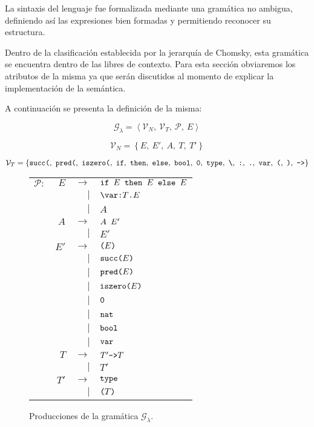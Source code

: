 \documentclass[11pt]{article}
\newcommand\produces{$\rightarrow$ \qquad}
\newcommand\alsoproduces{$\vert$}
\begin{document}
La sintaxis del lenguaje fue formalizada mediante una gramática no ambigua,
definiendo así las expresiones bien formadas y permitiendo reconocer su
estructura.

Dentro de la clasificación establecida por la jerarquía de Chomsky, esta
gramática se encuentra dentro de las libres de contexto. Para esta sección
obviaremos los atributos de la misma ya que serán discutidos al momento de
explicar la implementación de la semántica.

A continuación se presenta la definición de la misma:

\[ \mathcal{G}_{\lambda} = \left\langle
	\mathcal{V}_N,\ \mathcal{V}_T,\ \mathcal{P},\ E \right\rangle \]

\[ \mathcal{V}_N = \left\lbrace E,\ E',\ A,\ T,\ T' \right\rbrace \]

\[ \mathcal{V}_T = \left\lbrace
	\verb|succ(|,\ \verb|pred(|,\ \verb|iszero(|,\ 
	\verb|if|,\ \verb|then|,\ \verb|else|,\ \verb|bool|,\ 
    \verb|0|,\ \verb|type|,\ \verb|\|,\ \verb|:|,\ \verb|.|,\ 
    \verb|var|,\ \verb|(|,\ \verb|)|,\ \verb|->|
    \right\rbrace \]

\begin{figure}[H] \centering
\begin{tabular}{lrrl}
$\mathcal{P}:$
& $E$  & \produces     & $\verb|if | E \verb| then | E \verb| else | E$ \\
&      & \alsoproduces & $\verb|\var:| T \verb|.| E$ \\
&      & \alsoproduces & $A$ \\
& $A$  & \produces     & $A \verb| | E'$ \\
&      & \alsoproduces & $E'$ \\
& $E'$ & \produces     & $\verb|(| E \verb|)|$ \\
&      & \alsoproduces & $\verb|succ(| E \verb|)|$ \\
&      & \alsoproduces & $\verb|pred(| E \verb|)|$ \\
&      & \alsoproduces & $\verb|iszero(| E \verb|)|$ \\
&      & \alsoproduces & $\verb|0|$ \\
&      & \alsoproduces & $\verb|nat|$ \\
&      & \alsoproduces & $\verb|bool|$ \\
&      & \alsoproduces & $\verb|var|$ \\
& $T$  & \produces     & $T' \verb|->| T$ \\
&      & \alsoproduces & $T'$ \\
& $T'$ & \produces     & $\verb|type|$ \\
&      & \alsoproduces & $\verb|(| T \verb|)|$ \\
\end{tabular}
\caption{Producciones de la gramática $\mathcal{G}_{\lambda}$.}
\label{fig:gramatica}
\end{figure}
\end{document}
